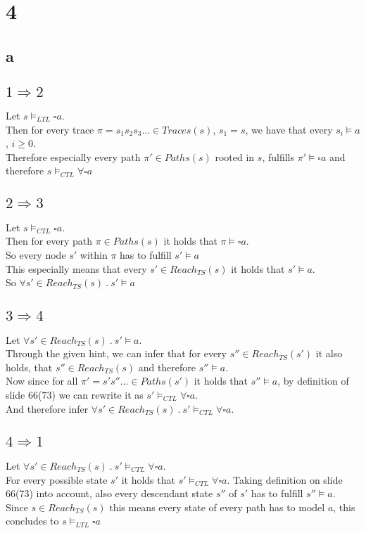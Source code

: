 \documentclass[11pt]{article}
\begin{document}
\section{4}
\subsection{a}
\subsection{$1 \Rightarrow 2$}
Let $s\models_{LTL} \square a$.\\
Then for every trace $\pi = s_1s_2s_3\dots \in Traces(s)$, $s_1 = s$, we have that every $s_i \models a$, $i \ge 0$.\\
Therefore especially every path $\pi' \in Paths(s)$ rooted in $s$, fulfills $\pi' \models \square a$ and therefore $s \models_{CTL} \forall\square a$
\subsection{$2 \Rightarrow 3$}
Let $s \models_{CTL} \square a$.\\
Then for every path $\pi \in Paths(s)$ it holds that $\pi \models \square a$. \\
So every node $s'$ within $\pi$ has to fulfill $s'\models a$\\
This especially means that every $s' \in Reach_{TS}(s)$ it holds that $s' \models a$.\\
So $\forall s' \in Reach_{TS}(s) \>.\> s' \models a$

\subsection{$3 \Rightarrow 4$}
Let $\forall s' \in Reach_{TS}(s) \>.\> s' \models a$.\\
Through the given hint, we can infer that for every $s'' \in Reach_{TS}(s')$ it also holds, that $s'' \in Reach_{TS}(s)$ and therefore $s'' \models a$.\\
Now since for all $\pi' = s's''\dots \in Paths(s')$ it holds that $s'' \models a$, by definition of slide 66(73) we can rewrite it as $s' \models_{CTL} \forall\square a$.\\
And therefore infer $\forall s' \in Reach_{TS}(s) \>.\> s' \models_{CTL} \forall\square a$.

\subsection{$4 \Rightarrow 1$}
Let $\forall s' \in Reach_{TS}(s) \>.\> s' \models_{CTL} \forall\square a$.\\
For every possible state $s'$ it holds that $s'\models_{CTL} \forall \square a$. Taking definition on slide 66(73) into account, also every descendant state $s''$ of $s'$ has to fulfill $s'' \models a$.
Since $s \in Reach_{TS}(s)$ this means every state of every path has to model $a$, this concludes to $s \models_{LTL} \square a$
\end{document}
